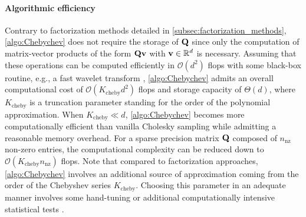 \documentclass[nohypdvips,onefignum,onetabnum]{siamart171218}
\begin{document}
\paragraph{Algorithmic efficiency}
Contrary to factorization methods detailed in \cref{subsec:factorization_methods}, \cref{algo:Chebychev} does not require the storage of $\mathbf{Q}$ since only the computation of matrix-vector products of the form $\mathbf{Qv}$ with $\mathbf{v} \in \mathbb{R}^d$ is necessary.
Assuming that these operations can be computed efficiently in $\mathcal{O}(d^2)$ flops with some black-box routine, e.g., a fast wavelet transform \cite{Mallat_book}, \cref{algo:Chebychev} admits an overall computational cost of
$\mathcal{O}(K_{\mathrm{cheby}}d^2)$ flops and storage capacity of $\Theta(d)$, where $K_{\mathrm{cheby}}$ is a truncation parameter standing for the order of the polynomial approximation. 
When $K_{\mathrm{cheby}} \ll d$, \cref{algo:Chebychev} becomes more computationally efficient than vanilla Cholesky sampling while admitting a reasonable memory overhead.
For a sparse precision matrix $\mathbf{Q}$ composed of $n_{\mathrm{nz}}$ non-zero entries, the computational complexity can be reduced down to $\mathcal{O}(K_{\mathrm{cheby}}n_{\mathrm{nz}})$ flops. 
Note that compared to factorization approaches, \cref{algo:Chebychev} involves an additional source of approximation coming from the order of the Chebyshev series $K_{\mathrm{cheby}}$.
Choosing this parameter in an adequate manner involves some hand-tuning or additional computationally intensive statistical tests \cite{Pereira2019}. 
\end{document}
